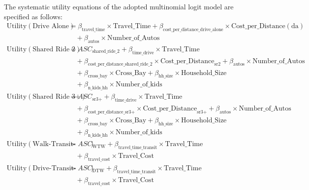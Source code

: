 The systematic utility equations of the adopted multinomial logit model are specified as follows:
\begin{equation*}
   \begin{aligned}
   \textrm{Utility} \left(\textrm{Drive Alone}\right) &= \beta_{\textrm{travel\_time}} \times \textrm{Travel\_Time} + \beta_{\textrm{cost\_per\_distance\_drive\_alone}} \times \textrm{Cost\_per\_Distance}\left(\textrm{da}\right) \\
   &\quad + \beta_{\textrm{autos}} \times \textrm{Number\_of\_Autos} \\
   \textrm{Utility} \left(\textrm{Shared Ride 2}\right) &= ASC_{\textrm{shared\_ride\_2}} + \beta_{\textrm{time\_drive}} \times \textrm{Travel\_Time} \\
   &\quad + \beta_{\textrm{cost\_per\_distance\_shared\_ride\_2}} \times \textrm{Cost\_per\_Distance}_{ \textrm{sr2} } + \beta_{\textrm{autos}}  \times \textrm{Number\_of\_Autos} \\
   &\quad + \beta_{\textrm{cross\_bay}} \times \textrm{Cross\_Bay} + \beta_{\textrm{hh\_size}} \times \textrm{Household\_Size} \\
   &\quad + \beta_{\textrm{n\_kids\_hh}} \times \textrm{Number\_of\_kids} \\
   \textrm{Utility} \left(\textrm{Shared Ride 3+}\right) &= ASC_{\textrm{sr3+}} + \beta_{\textrm{time\_drive}} \times \textrm{Travel\_Time} \\
   &\quad + \beta_{\textrm{cost\_per\_distance\_sr3+}} \times \textrm{Cost\_per\_Distance}_{\textrm{sr3+}} + \beta_{\textrm{autos}}  \times \textrm{Number\_of\_Autos} \\
   &\quad + \beta_{\textrm{cross\_bay}} \times \textrm{Cross\_Bay} + \beta_{\textrm{hh\_size}} \times \textrm{Household\_Size} \\
   &\quad + \beta_{\textrm{n\_kids\_hh}} \times \textrm{Number\_of\_kids} \\
   \textrm{Utility} \left(\textrm{Walk-Transit-Walk}\right) &= ASC_{\textrm{WTW}} + \beta_{\textrm{travel\_time\_transit}} \times \textrm{Travel\_Time} \\
   &\quad + \beta_{\textrm{travel\_cost}} \times \textrm{Travel\_Cost} \\
   \textrm{Utility} \left(\textrm{Drive-Transit-Walk}\right) &= ASC_{\textrm{DTW}} + \beta_{\textrm{travel\_time\_transit}} \times \textrm{Travel\_Time} \\
   &\quad + \beta_{\textrm{travel\_cost}} \times \textrm{Travel\_Cost} \\

\end{aligned}
\end{equation*}

